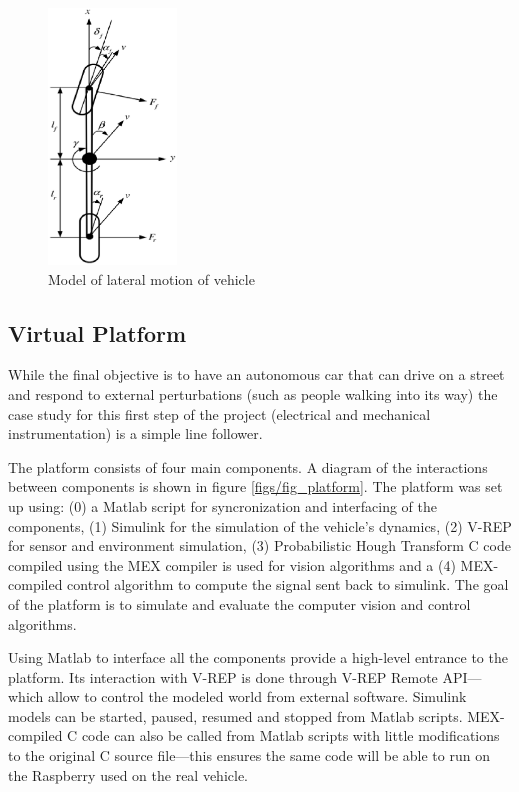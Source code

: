 \documentclass[twocolumn,10pt]{asme2e}
\begin{document}
\begin{figure}
\begin{center}
\includegraphics[height=6.8cm]{figs/fig_chang.eps}
\caption{Model of lateral motion of vehicle \cite{chang}}
\label{figs/fig_chang}
\end{center}
\end{figure}

\subsection*{Virtual Platform}

While the final objective is to have an autonomous car that can drive
on a street and respond to external perturbations (such as people walking
into its way) the case study for this first step of the project (electrical
and mechanical instrumentation) is a simple line follower.

The platform consists of four main components. A diagram of the interactions between components is shown in figure \ref{figs/fig_platform}.
The platform was set up using: (0) a Matlab script for syncronization and interfacing of the components,
(1) Simulink for the simulation of the vehicle's dynamics, (2) V-REP for sensor
and environment simulation, (3) Probabilistic Hough Transform\cite{xuhough} C code
compiled using the MEX compiler is used for vision algorithms and a (4) MEX-compiled control algorithm
to compute the signal sent back to simulink. The goal of the platform is to simulate and evaluate
the computer vision and control algorithms.

Using Matlab to interface all the components provide a high-level entrance to
the platform. Its interaction with V-REP is done through V-REP Remote API---which allow
to control the modeled world from external software. Simulink models can be
started, paused, resumed and stopped from Matlab scripts. MEX-compiled C code can
also be called from Matlab scripts with little modifications to the original C source 
file---this ensures the same code will be able to run on the Raspberry used on the
real vehicle.
\end{document}
